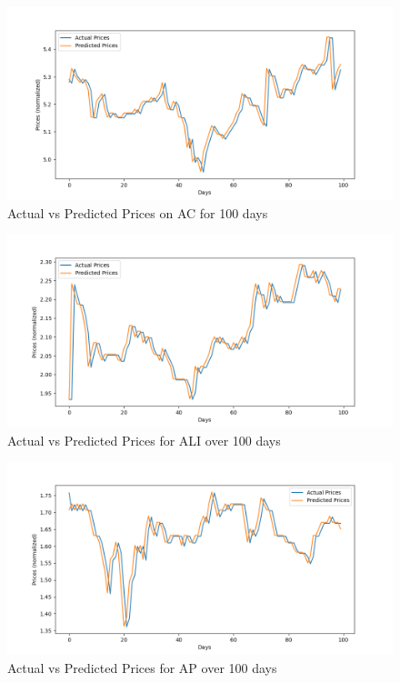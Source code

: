 \begin{figure}[ht]
    \centering
    \includegraphics[width=1\textwidth]{./assets/Chapter_4/DMD_LSTM_crossval/100days/AC.png}
    \caption{Actual vs Predicted Prices on AC for 100 days}
    \label{fig:crossval100_AC}
\end{figure}
\FloatBarrier
    
\begin{figure}[ht]
    \centering
    \includegraphics[width=1\textwidth]{./assets/Chapter_4/DMD_LSTM_crossval/100days/ALI.png}
    \caption{Actual vs Predicted Prices for ALI over 100 days}
    \label{fig:crossval100_ALI}
\end{figure}
\FloatBarrier

\begin{figure}[ht]
    \centering
    \includegraphics[width=1\textwidth]{./assets/Chapter_4/DMD_LSTM_crossval/100days/AP.png}
    \caption{Actual vs Predicted Prices for AP over 100 days}
    \label{fig:crossval100_AP}
\end{figure}
\FloatBarrier

